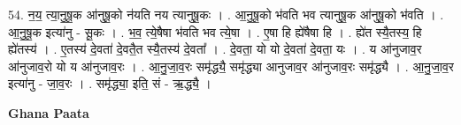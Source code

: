 \documentclass[17pt]{extarticle}
\begin{document}
54. न॒य॒ त्या॒नु॒षू॒क आ॑नुषू॒को न॑यति नय त्यानुषू॒कः । . आ॒नु॒षू॒को भ॑वति भव त्यानुषू॒क आ॑नुषू॒को भ॑वति । . आ॒नु॒षू॒क इत्या॑नु - सू॒कः । . भ॒व॒ त्ये॒षैषा भ॑वति भव त्ये॒षा । . ए॒षा हि ह्ये॑षैषा हि । . ह्ये॑त स्यै॒तस्य॒ हि ह्ये॑तस्य॑ । . ए॒तस्य॑ दे॒वता॑ दे॒वतै॒त स्यै॒तस्य॑ दे॒वता᳚ । . दे॒वता॒ यो यो दे॒वता॑ दे॒वता॒ यः । . य आ॑नुजाव॒र आ॑नुजाव॒रो यो य आ॑नुजाव॒रः । . आ॒नु॒जा॒व॒रः समृ॑द्ध्यै॒ समृ॑द्ध्या आनुजाव॒र आ॑नुजाव॒रः समृ॑द्ध्यै । . आ॒नु॒जा॒व॒र इत्या॑नु - जा॒व॒रः । . समृ॑द्ध्या॒ इति॒ सं - ऋ॒द्ध्यै॒ । \newline

\textbf{Ghana Paata } \newline
\end{document}
